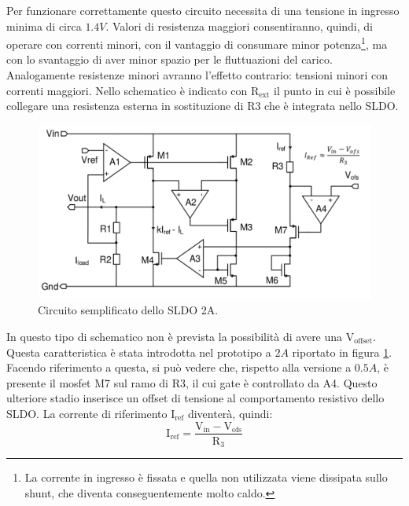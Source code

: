 Per funzionare correttamente questo circuito necessita di una tensione in ingresso minima di circa $1.4V$.
Valori di resistenza maggiori consentiranno, quindi, di operare con correnti minori, con il vantaggio di consumare minor potenza\footnote{
  La corrente in ingresso è fissata e quella non utilizzata viene dissipata sullo shunt, che diventa conseguentemente molto caldo.
},
ma con lo svantaggio di aver minor spazio per le fluttuazioni del carico. 
Analogamente resistenze minori avranno l'effetto contrario: tensioni minori con correnti maggiori.
Nello schematico è indicato con $\mathrm{R_{ext}}$ il punto in cui è possibile collegare una resistenza esterna in sostituzione di R3 che \`e integrata nello SLDO.
\begin{figure}
\centering
\includegraphics[width=\linewidth]{Immagini/SLDO2A}
\caption{Circuito semplificato dello SLDO 2A.}
\label{SLDO2A}
\end{figure}
In questo tipo di schematico non è prevista la possibilità di avere una $\mathrm{V_{offset}}$.
Questa caratteristica è stata introdotta nel prototipo a $2A$ riportato in figura \ref{SLDO2A}.
Facendo riferimento a questa, si può vedere che, rispetto alla versione a $0.5A$, è presente il mosfet M7 sul ramo di R3, il cui gate è controllato da A4.
Questo ulteriore stadio inserisce un offset di tensione al comportamento resistivo dello SLDO. La corrente di riferimento $\mathrm{I_{ref}}$ diventerà, quindi:
\begin{equation}
\mathrm{I_{ref} = \frac{V_{in} - V_{ofs}}{R_3}}
\end{equation}



